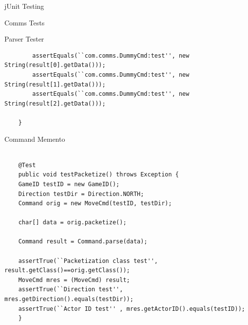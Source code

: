 \documentclass[12pt]{report}
\begin{document}
\begin{chapter}{jUnit Testing}
\begin{section}{Comms Tests}
\begin{subsection}{Parser Tester}
\begin{lstlisting}
        assertEquals(``com.comms.DummyCmd:test'', new String(result[0].getData()));
        assertEquals(``com.comms.DummyCmd:test'', new String(result[1].getData()));
        assertEquals(``com.comms.DummyCmd:test'', new String(result[2].getData()));

    }

 \end{lstlisting}
  \end{subsection}

  \begin{subsection}{Command Memento}
   \begin{lstlisting}
    
    @Test
    public void testPacketize() throws Exception {
    GameID testID = new GameID();
    Direction testDir = Direction.NORTH;
    Command orig = new MoveCmd(testID, testDir);

    char[] data = orig.packetize();

    Command result = Command.parse(data);

    assertTrue(``Packetization class test'', result.getClass()==orig.getClass());
    MoveCmd mres = (MoveCmd) result;
    assertTrue(``Direction test'', mres.getDirection().equals(testDir));
    assertTrue(``Actor ID test'' , mres.getActorID().equals(testID));
    }



\end{lstlisting}
\end{subsection}
\end{section}
\end{chapter}
\end{document}
